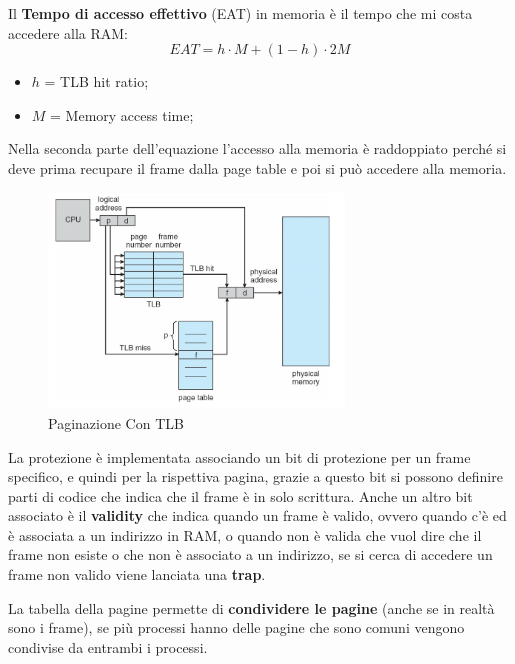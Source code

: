 \documentclass[12pt]{article}
\begin{document}
\begin{center}
\end{center}
Il \textbf{Tempo di accesso effettivo} (EAT) in memoria \`e il tempo che mi costa accedere alla RAM:
\[ EAT = h \cdot M + (1 - h) \cdot 2M  \]
\begin{itemize}
  \item $h$ = TLB hit ratio;
  \item $M$ = Memory access time;
\end{itemize}
Nella seconda parte dell'equazione l'accesso alla memoria \`e raddoppiato perch\'e si deve prima recupare il frame dalla page table e poi si pu\`o accedere alla memoria.
\begin{figure}[H]
  \centering
  \includegraphics[width=0.7\textwidth]{paginazione-con-tlb.png}
  \caption{Paginazione Con TLB}
  \label{fig:paginazione-con-tlb}
\end{figure}
La protezione \`e implementata associando un bit di protezione per un frame specifico, e quindi per la rispettiva pagina, grazie a questo bit si possono definire parti di codice che indica che il frame \`e in solo scrittura. Anche un altro bit associato \`e il \textbf{validity} che indica quando un frame \`e valido, ovvero quando c'\`e ed \`e associata a un indirizzo in RAM, o quando non \`e valida che vuol dire che il frame non esiste o che non \`e associato a un indirizzo, se si cerca di accedere un frame non valido viene lanciata una \textbf{trap}.

La tabella della pagine permette di \textbf{condividere le pagine} (anche se in realt\`a sono i frame), se pi\`u processi hanno delle pagine che sono comuni vengono condivise da entrambi i processi.
\end{document}
